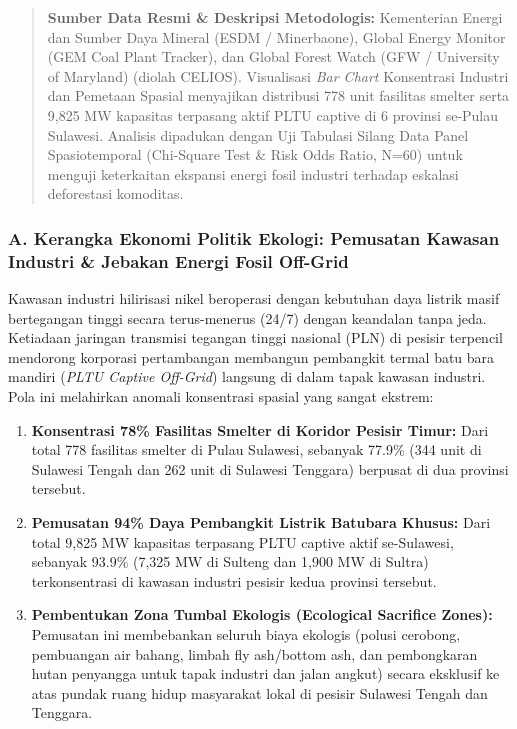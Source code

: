 \documentclass[
]{article}
\providecommand{\tightlist}{%
  \setlength{\itemsep}{0pt}\setlength{\parskip}{0pt}}
\begin{document}
\begin{quote}
\textbf{Sumber Data Resmi \& Deskripsi Metodologis:} Kementerian Energi
dan Sumber Daya Mineral (ESDM / Minerbaone), Global Energy Monitor (GEM
Coal Plant Tracker), dan Global Forest Watch (GFW / University of
Maryland) (diolah CELIOS). Visualisasi \emph{Bar Chart} Konsentrasi
Industri dan Pemetaan Spasial menyajikan distribusi 778 unit fasilitas
smelter serta 9,825 MW kapasitas terpasang aktif PLTU captive di 6
provinsi se-Pulau Sulawesi. Analisis dipadukan dengan Uji Tabulasi
Silang Data Panel Spasiotemporal (Chi-Square Test \& Risk Odds Ratio,
N=60) untuk menguji keterkaitan ekspansi energi fosil industri terhadap
eskalasi deforestasi komoditas.
\end{quote}

\subsubsection{A. Kerangka Ekonomi Politik Ekologi: Pemusatan Kawasan
Industri \& Jebakan Energi Fosil
Off-Grid}\label{a.-kerangka-ekonomi-politik-ekologi-pemusatan-kawasan-industri-jebakan-energi-fosil-off-grid}

Kawasan industri hilirisasi nikel beroperasi dengan kebutuhan daya
listrik masif bertegangan tinggi secara terus-menerus (24/7) dengan
keandalan tanpa jeda. Ketiadaan jaringan transmisi tegangan tinggi
nasional (PLN) di pesisir terpencil mendorong korporasi pertambangan
membangun pembangkit termal batu bara mandiri (\emph{PLTU Captive
Off-Grid}) langsung di dalam tapak kawasan industri. Pola ini melahirkan
anomali konsentrasi spasial yang sangat ekstrem:

\begin{enumerate}
\def\labelenumi{\arabic{enumi}.}
\tightlist
\item
  \textbf{Konsentrasi 78\% Fasilitas Smelter di Koridor Pesisir Timur:}
  Dari total 778 fasilitas smelter di Pulau Sulawesi, sebanyak 77.9\%
  (344 unit di Sulawesi Tengah dan 262 unit di Sulawesi Tenggara)
  berpusat di dua provinsi tersebut.
\item
  \textbf{Pemusatan 94\% Daya Pembangkit Listrik Batubara Khusus:} Dari
  total 9,825 MW kapasitas terpasang PLTU captive aktif se-Sulawesi,
  sebanyak 93.9\% (7,325 MW di Sulteng dan 1,900 MW di Sultra)
  terkonsentrasi di kawasan industri pesisir kedua provinsi tersebut.
\item
  \textbf{Pembentukan Zona Tumbal Ekologis (Ecological Sacrifice
  Zones):} Pemusatan ini membebankan seluruh biaya ekologis (polusi
  cerobong, pembuangan air bahang, limbah fly ash/bottom ash, dan
  pembongkaran hutan penyangga untuk tapak industri dan jalan angkut)
  secara eksklusif ke atas pundak ruang hidup masyarakat lokal di
  pesisir Sulawesi Tengah dan Tenggara.
\end{enumerate}
\end{document}
